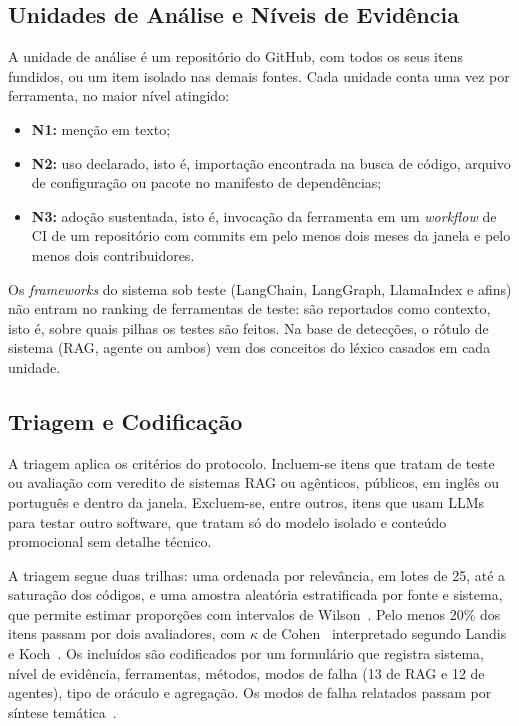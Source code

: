 \documentclass[sigconf]{acmart}
\begin{document}
\subsection{Unidades de Análise e Níveis de Evidência}

A unidade de análise é um repositório do GitHub, com todos os seus itens fundidos, ou um item isolado nas demais fontes. Cada unidade conta uma vez por ferramenta, no maior nível atingido:
\begin{itemize}
  \item \textbf{N1:} menção em texto;
  \item \textbf{N2:} uso declarado, isto é, importação encontrada na busca de código, arquivo de configuração ou pacote no manifesto de dependências;
  \item \textbf{N3:} adoção sustentada, isto é, invocação da ferramenta em um \textit{workflow} de CI de um repositório com commits em pelo menos dois meses da janela e pelo menos dois contribuidores.
\end{itemize}
Os \textit{frameworks} do sistema sob teste (LangChain, LangGraph, LlamaIndex e afins) não entram no ranking de ferramentas de teste: são reportados como contexto, isto é, sobre quais pilhas os testes são feitos. Na base de detecções, o rótulo de sistema (RAG, agente ou ambos) vem dos conceitos do léxico casados em cada unidade.

\subsection{Triagem e Codificação}

A triagem aplica os critérios do protocolo. Incluem-se itens que tratam de teste ou avaliação com veredito de sistemas RAG ou agênticos, públicos, em inglês ou português e dentro da janela. Excluem-se, entre outros, itens que usam LLMs para testar outro software, que tratam só do modelo isolado e conteúdo promocional sem detalhe técnico.

A triagem segue duas trilhas: uma ordenada por relevância, em lotes de 25, até a saturação dos códigos, e uma amostra aleatória estratificada por fonte e sistema, que permite estimar proporções com intervalos de Wilson~\cite{wilson1927}. Pelo menos 20\% dos itens passam por dois avaliadores, com $\kappa$ de Cohen~\cite{cohen1960kappa} interpretado segundo Landis e Koch~\cite{landis1977measurement}. Os incluídos são codificados por um formulário que registra sistema, nível de evidência, ferramentas, métodos, modos de falha (13 de RAG e 12 de agentes), tipo de oráculo e agregação. Os modos de falha relatados passam por síntese temática~\cite{cruzes2011thematic}.
\end{document}
